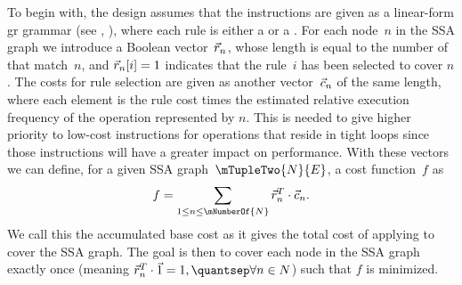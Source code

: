 To begin with, the design assumes that the \glspl{instruction} are given as a
\gls{linear-form gr} \gls{grammar} (see
, ), where each
\gls{rule} is either a \tbaseRule or a \tchainRule.
%
For each \gls{node}~$n$ in
the \gls{SSA graph} we introduce a Boolean vector~$\vec{r}_n$, whose length
is equal to the number of \tbaseRules that match~$n$, and
\mbox{$\vec{r}_n[i] = 1$} indicates that the \gls{rule}~$i$ has been
selected to cover $n$.
%
The costs for \gls{rule} selection are given as another
vector~$\vec{c}_n$ of the same length, where each element is the \gls{rule}
cost times the estimated relative execution frequency of the operation
represented by $n$.
%
This is needed to give higher priority to low-cost
\glspl{instruction} for operations that reside in tight loops since those
\glspl{instruction} will have a greater impact on performance.
%
With these
vectors we can define, for a given \gls{SSA graph}~$\mTupleTwo{N}{E}$, a cost
function~$f$ as
\begin{displaymath}
  f = \sum_{1 \leq n \leq \mNumberOf{N}} \mVector{r}_n^T \cdot \mVector{c}_n.
\end{displaymath}
We call this the accumulated \gls{base cost} as it gives the total cost of
applying \tbaseRules to cover the \gls{SSA graph}.
%
The goal is then to cover
each \gls{node} in the \gls{SSA graph} exactly once (meaning
\mbox{$\mVector{r}_n^T \cdot \mVector{1} = 1, \quantsep \forall n \in N$}) such
that $f$ is minimized.

